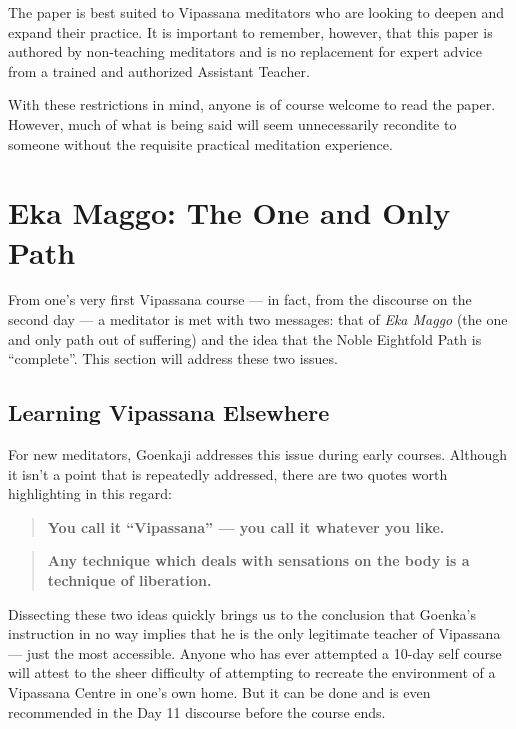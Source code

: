 \documentclass[a4paper, amsfonts, amssymb, amsmath, reprint, showkeys, nofootinbib, twoside]{revtex4-1}
\begin{document}
The paper is best suited to Vipassana meditators who are looking to deepen and expand
their practice. It is important to remember, however, that this paper is authored by
non-teaching meditators and is no replacement for expert advice from a trained and
authorized Assistant Teacher.

With these restrictions in mind, anyone is of course welcome to read the
paper. However, much of what is being said will seem unnecessarily recondite to
someone without the requisite practical meditation experience.


\section{Eka Maggo: The One and Only Path}

From one's very first Vipassana course --- in fact, from the discourse on the second
day --- a meditator is met with two messages: that of \textit{Eka Maggo} (the one and
only path out of suffering) and the idea that the Noble Eightfold Path is
``complete''. This section will address these two issues.

\subsection{Learning Vipassana Elsewhere}

For new meditators, Goenkaji addresses this issue during early
courses. Although it isn't a point that is repeatedly addressed, there are two quotes
worth highlighting in this regard:

\begin{quote}
  \textbf{You call it ``Vipassana'' --- you call it whatever you like.}
\end{quote}


\begin{quote}
  \textbf{Any technique which deals with sensations on the body is a technique of
  liberation.}
\end{quote}


Dissecting these two ideas quickly brings us to the conclusion that Goenka's
instruction in no way implies that he is the only legitimate teacher of Vipassana ---
just the most accessible. Anyone who has ever attempted a 10-day self course will
attest to the sheer difficulty of attempting to recreate the environment of a
Vipassana Centre in one's own home. But it can be done and is even recommended in the
Day 11 discourse before the course ends. 
\end{document}
